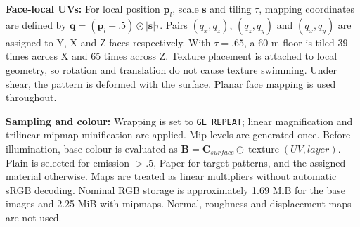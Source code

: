 \textbf{Face-local UVs:} For local position $\mathbf p_l$, scale $\mathbf s$ and tiling $\tau$, mapping coordinates are defined by $\mathbf q=(\mathbf p_l+.5)\odot|\mathbf s|\tau$. Pairs $(q_x,q_z)$, $(q_z,q_y)$ and $(q_x,q_y)$ are assigned to Y, X and Z faces respectively. With $\tau=.65$, a 60 m floor is tiled 39 times across X and 65 times across Z. Texture placement is attached to local geometry, so rotation and translation do not cause texture swimming. Under shear, the pattern is deformed with the surface. Planar face mapping is used throughout.

\textbf{Sampling and colour:} Wrapping is set to \texttt{GL\_REPEAT}; linear magnification and trilinear mipmap minification are applied. Mip levels are generated once. Before illumination, base colour is evaluated as $\mathbf B=\mathbf C_{surface}\odot\operatorname{texture}(UV,layer)$. Plain is selected for emission $>.5$, Paper for target patterns, and the assigned material otherwise. Maps are treated as linear multipliers without automatic sRGB decoding. Nominal RGB storage is approximately 1.69 MiB for the base images and 2.25 MiB with mipmaps. Normal, roughness and displacement maps are not used.

